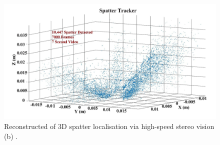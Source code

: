\begin{figure}
    \centering
    \label{fig:barretspatter}
    \includegraphics[scale=0.3]{Images/splatter.png}
    \caption[3D spatter reconstruction.]{Reconstructed of 3D spatter localisation via high-speed stereo vision (b) \cite{barrett_statistical_2019}.}
\end{figure}

